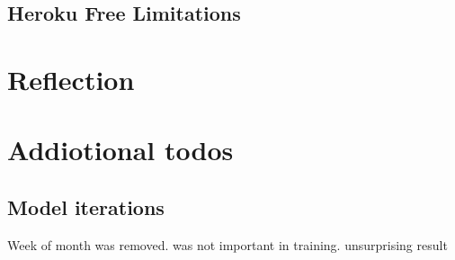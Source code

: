 \documentclass[journal,10pt]{IEEEtran}
\begin{document}
\subsection{Heroku Free Limitations}




\section{Reflection}


\section{Addiotional todos}
\subsection{Model iterations}

Week of month was removed. was not important in training. unsurprising result
  

\end{document}
